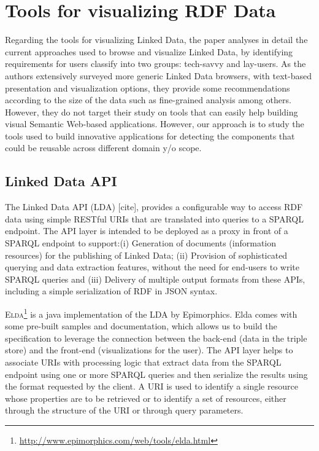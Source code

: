 \section{Tools for visualizing RDF Data}
\label{sec:vizrdf}
Regarding the tools for visualizing Linked Data,  the paper \cite{aba2011} analyses in detail the current approaches used to browse and visualize Linked Data, by identifying requirements for users classify into two groups: tech-savvy and lay-users. As the authors extensively surveyed more generic Linked Data browsers, with text-based presentation and visualization options, they provide some recommendations according to the size of the data such as fine-grained analysis among others. However, they do not target their study on tools that can easily help building visual Semantic Web-based applications. However, our approach is to study the tools used to build innovative applications for detecting the components that could be reusable across different domain y/o scope. 


\subsection{Linked Data API}
The Linked Data API (LDA) [cite], provides a configurable way to access RDF data using simple RESTful URIs that are translated into queries to a SPARQL endpoint. The API layer is intended to be deployed as a proxy in front of a SPARQL endpoint to support:(i) Generation of documents (information resources) for the publishing of Linked Data; (ii) Provision of sophisticated querying and data extraction features, without the need for end-users to write SPARQL queries and (iii) Delivery of multiple output formats from these APIs, including a simple serialization of RDF in JSON syntax.

\textsc{Elda}\footnote{\url{http://www.epimorphics.com/web/tools/elda.html}} is a java implementation of the LDA by Epimorphics. Elda comes with some pre-built samples and documentation, which allows us to build the specification to leverage the connection between the back-end (data in the triple store) and the front-end (visualizations for the user). The API layer helps to associate URIs with processing logic that extract data from the SPARQL endpoint using one or more SPARQL queries and then serialize the results using the format requested by the client. A URI is used to identify a single resource whose properties are to be retrieved or to identify a set of resources, either through the structure of the URI or through query parameters.

